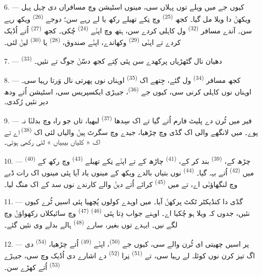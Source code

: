 6. --- کیوں جے میں ویلے توں پہلاں سی، مینوں اسٹیشن وچ مسافراں دی چہل پہل ویکھݨ دا
ویلا مل گیا۔ کجھ  \textsuperscript{(25)} وچ نِکے تھیلے رکھ یا لے
رہے سن؛ دوجے  \textsuperscript{(26)} ویکھ رہے سن۔ آندے
مسافر  \textsuperscript{(32)} ول کاہلی کردے سن، ہتھ وچ اپݨے
 \textsuperscript{(24)} چُکی۔ کجھ 
\textsuperscript{(27)} اُتے اُڈیک کردے تے اپݨی  \textsuperscript{(29)}
وکھاندے، اپݨے صندوق،  \textsuperscript{(28)} یا 
\textsuperscript{(30)} لیݨ لئی۔

7. ---  \textsuperscript{(33)} دھیان نال گٹھڑیاں پرکھدے سن پئی
کِتے کجھ دسّݨ جوگ تے نئیں۔

8. --- کجھ مسافر  \textsuperscript{(34)} ول گئے، جِتھے اک
 \textsuperscript{(35)} اوہناں نوں پھرتی نال وَرتا رہیا سی۔ اوہناں نوں
کاہلی کرنی سی، کیوں جے  \textsuperscript{(36)}، جیہڑی ایکسپریس سی،
اسٹیشن اُتے ودھ دیر نئیں رُکدی۔

9. --- فیر میں ٹُرن دے پلیٹ فارم اُتے گیا تے اک سِدھا 
\textsuperscript{(37)} لبھیا، تاں جو راہ وچ بدلݨا نہ پوے۔ میں لانگھے والی اک گڈی وچ
چڑھیا، جیدے وچ سگرٹ پیݨ والیاں لئی اک  \textsuperscript{(38)} اے تے
اک « کلیاں بیبیاں » لئی رکھی ہوئی۔

\VUsaut{3.0mm}

10. ---  \textsuperscript{(40)} چڑھ کے، 
\textsuperscript{(39)} بند کر کے،  \textsuperscript{(41)} چاڑھ کے تے اپݨے
نِکے تھیلے  \textsuperscript{(43)} وچ رکھ کے میں 
\textsuperscript{(42)} اُتے بہہ گیا۔  \textsuperscript{(44)} نوں
بتیاں بالدے ویکھ کے مینوں یاد آیا پئی مینوں اک رات ڈبے وچ لنگھاؤݨی اے، تے میں
 \textsuperscript{(45)} کرائے اُتے دیݨ والے کارندے نوں سد کے اک منگ
لیا۔

11. --- گڈی دا کنڈیکٹر ٹکٹ پرکھݨ آیا۔ میں اوہدے کولوں پُچھیا پئی اسیں ٹُرے کیوں
نئیں، جدوں کہ ویلا ہو چُکیا اے۔ اوہنے جواب دِتا پئی 
\textsuperscript{(46)}  \textsuperscript{(47)} وچ سائیکلاں
رکھواؤݨ وچ لگے نیں۔ ایہدے توں بغیر، سارے 
\textsuperscript{(48)} ہالے بدلے وی نئیں گئے۔

12. --- پر اسیں چھیتی ای ٹُرن والے سی، کیوں جے 
\textsuperscript{(50)}، اپݨے  \textsuperscript{(49)} اُتے چڑھیا،
 \textsuperscript{(54)} دی اگ تیز کرن نوں کوئلہ لے رہیا سی، تے
 \textsuperscript{(51)} نِرا 
\textsuperscript{(52)} دے اشارے دی اُڈیک وچ سی، جیہڑے 
\textsuperscript{(53)} اُتے کھڑے سن۔

